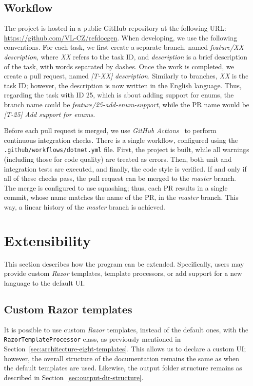 \subsection*{Workflow}
The project is hosted in a public GitHub repository at the following URL: \url{https://github.com/VL-CZ/refdocgen}.
When developing, we use the following conventions.
For each task, we first create a separate branch, named \textit{feature/XX-description}, where \textit{XX} refers to the task ID, and \textit{description} is a brief description of the task, with words separated by dashes.
Once the work is completed, we create a pull request, named \textit{[T-XX] description}.
Similarly to branches, \textit{XX} is the task ID; however, the description is now written in the English language.
Thus, regarding the task with ID 25, which is about adding support for enums, the branch name could be \textit{feature/25-add-enum-support}, while the PR name would be \textit{[T-25] Add support for enums}.

Before each pull request is merged, we use \textit{GitHub Actions}~\cite{github_actions} to perform continuous integration checks.
There is a single workflow, configured using the \texttt{.github/workflows/dotnet.yml} file.
First, the project is built, while all warnings (including those for code quality) are treated as errors.
Then, both unit and integration tests are executed, and finally, the code style is verified.
If and only if all of these checks pass, the pull request can be merged to the \textit{master} branch.
The merge is configured to use squashing; thus, each PR results in a single commit, whose name matches the name of the PR, in the \textit{master} branch.
This way, a linear history of the \textit{master} branch is achieved.

\section{Extensibility}

This section describes how the program can be extended.
Specifically, users may provide custom \textit{Razor} templates, template processors, or add support for a new language to the default UI.

\subsection{Custom Razor templates}
\label{sec:extensibility-custom-razor}

It is possible to use custom \textit{Razor} templates, instead of the default ones, with the \texttt{RazorTemplateProcessor} class, as previously mentioned in Section~\ref{sec:architecture-eight-templates}.
This allows us to declare a custom UI; however, the overall structure of the documentation remains the same as when the default templates are used.
Likewise, the output folder structure remains as described in Section~\ref{sec:output-dir-structure}.


